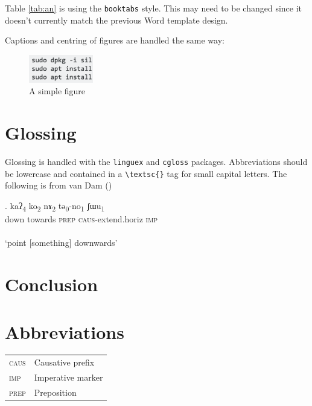 Table \ref{tab:an} is using the \texttt{booktabs} style. This may need to be changed since it doesn't currently match the previous Word template design.

Captions and centring  of figures are handled the same way:

\begin{figure}[htpb!]
  \centering
    \includegraphics[width=0.25\textwidth]{fig}
  \caption{A simple figure}
\end{figure}

\section{Glossing}

Glossing is handled with the \texttt{linguex} and \texttt{cgloss} packages. Abbreviations should be lowercase and contained in a \texttt{\textbackslash textsc\{\}} tag for small capital letters. The following is from van Dam (\citeyear{vandam2019syntax})

\exg.   kaʔ\textsubscript{4} ko\textsubscript{2} nɤ\textsubscript{2} tə\textsubscript{0}-no\textsubscript{1} ʃɯu\textsubscript{1}\\
		down towards {\textsc{prep}} {\textsc{caus}}-extend.horiz {\textsc{imp}}\\~\\
		`point [something] downwards'

\section{Conclusion}

\lipsum[3]

\section*{Abbreviations}

\vspace{-1em} %
\begin{table}[htpb!]
    \begin{tabular}{ll}
    \textsc{caus} & Causative prefix \\
    \textsc{imp} & Imperative marker \\
    \textsc{prep} & Preposition
	\end{tabular}
\end{table}


